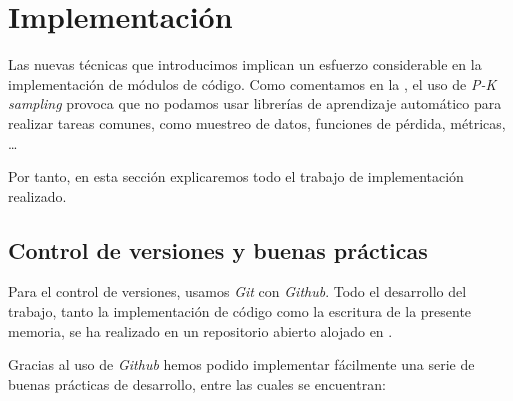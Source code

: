\chapter{Implementación} \label{ich:implementacion}

Las nuevas técnicas que introducimos implican un esfuerzo considerable en la implementación de módulos de código. Como comentamos en la , el uso de \textit{P-K sampling} provoca que no podamos usar librerías de aprendizaje automático para realizar tareas comunes, como muestreo de datos, funciones de pérdida, métricas, \ldots

Por tanto, en esta sección explicaremos todo el trabajo de implementación realizado.

\section{Control de versiones y buenas prácticas} \label{isec:github_buenas_practicas}

Para el control de versiones, usamos \textit{Git} con \textit{Github}. Todo el desarrollo del trabajo, tanto la implementación de código como la escritura de la presente memoria, se ha realizado en un repositorio abierto alojado en \cite{informatica:repogithub}.

Gracias al uso de \textit{Github} hemos podido implementar fácilmente una serie de buenas prácticas de desarrollo, entre las cuales se encuentran:

